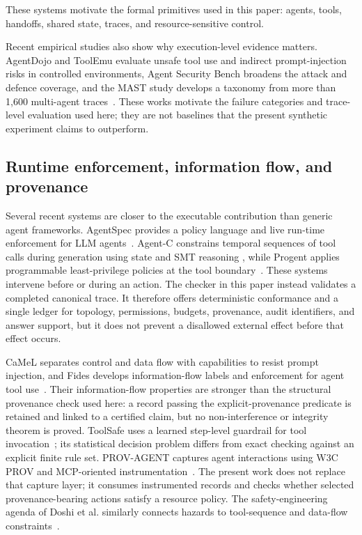 \documentclass[a4paper,fleqn]{cas-sc}
\begin{document}
These systems motivate the formal primitives used in this paper: agents, tools, handoffs, shared state, traces, and resource-sensitive control.

Recent empirical studies also show why execution-level evidence matters.
AgentDojo and ToolEmu evaluate unsafe tool use and indirect prompt-injection
risks in controlled environments, Agent Security Bench broadens the attack and
defence coverage, and the MAST study develops a taxonomy from more than 1,600
multi-agent traces~\cite{debenedetti2024agentdojo,ruan2024toolemu,
zhang2025asb,cemri2025mast}. These works motivate the failure categories and
trace-level evaluation used here; they are not baselines that the present
synthetic experiment claims to outperform.

\subsection{Runtime enforcement, information flow, and provenance}

Several recent systems are closer to the executable contribution than generic
agent frameworks. AgentSpec provides a policy language and live run-time
enforcement for LLM agents~\cite{wang2026agentspec}. Agent-C constrains temporal
sequences of tool calls during generation using state and SMT reasoning
\cite{kamath2025agentc}, while Progent applies programmable least-privilege
policies at the tool boundary~\cite{shi2025progent}. These systems intervene
before or during an action. The checker in this paper instead validates a
completed canonical trace. It therefore offers deterministic conformance and a
single ledger for topology, permissions, budgets, provenance, audit identifiers,
and answer support, but it does not prevent a disallowed external effect before
that effect occurs.

CaMeL separates control and data flow with capabilities to resist prompt
injection, and Fides develops information-flow labels and enforcement for agent
tool use~\cite{debenedetti2026camel,costa2025fides}. Their information-flow
properties are stronger than the structural provenance check used here: a
record passing the explicit-provenance predicate is retained and linked to a
certified claim, but no
non-interference or integrity theorem is proved. ToolSafe uses a learned
step-level guardrail for tool invocation~\cite{mou2026toolsafe}; its statistical
decision problem differs from exact checking against an explicit finite rule
set. PROV-AGENT captures agent interactions using W3C PROV and MCP-oriented
instrumentation~\cite{souza2025provagent}. The present work does not replace that
capture layer; it consumes instrumented records and checks whether selected
provenance-bearing actions satisfy a resource policy. The safety-engineering
agenda of Doshi et al. similarly connects hazards to tool-sequence and data-flow
constraints~\cite{doshi2026safetooluse}.
\end{document}
